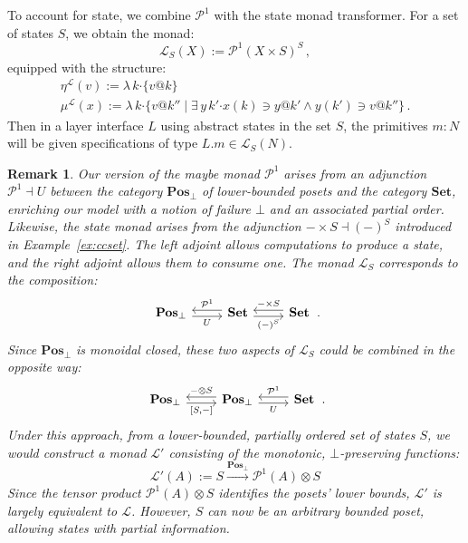 \documentclass[11pt,oneside]{book}
\newtheorem{remark}[theorem]{Remark}
\theoremstyle{definition}
\newcommand{\bdot}{\boldsymbol{\cdot}}
\begin{document}
To account for state,
we combine $\mathcal{P}^1$ with the state monad transformer.
For a set of states $S$,
we obtain the monad:
\[
  \mathcal{L}_S(X) :=
    \mathcal{P}^1(X \times S)^S \,,
\]
equipped with the structure:
\begin{gather*}
  \eta^\mathcal{L}(v) :=
    \lambda \, k \bdot \{ v@k \} \\
  \mu^\mathcal{L}(x) :=
    \lambda \, k \bdot \{ v@k'' \mid
      \exists \, y \, k' \bdot x(k) \ni y@k' \wedge y(k') \ni v@k'' \}
  \,.
\end{gather*}
Then in a layer interface $L$
using abstract states in the set $S$,
the primitives $m \mathbin: N$
will be given specifications
of type $L.m \in \mathcal{L}_S(N)$.

\begin{remark}
Our version of the \emph{maybe} monad $\mathcal{P}^1$
arises from an adjunction $\mathcal{P}^1 \dashv U$
between the category $\mathbf{Pos}_\bot$
of lower-bounded posets
and the category $\mathbf{Set}$,
enriching our model with a notion of failure $\bot$
and an associated partial order.
Likewise,
the state monad arises from the adjunction
$- \times S \dashv (-)^S$
introduced in Example~\ref{ex:ccset}.
The left adjoint allows computations to produce a state,
and the right adjoint allows them to consume one.
The monad $\mathcal{L}_S$ corresponds to the composition:
\[
  \begin{tikzcd}
    \mathbf{Pos}_\bot
      \ar[r, "U"', shift right] &
    \mathbf{Set}
      \ar[l, "\mathcal{P}^1"', shift right]
      \ar[r, "(-)^S"', shift right] &
    \mathbf{Set}
      \ar[l, "- \times S"', shift right]
   \end{tikzcd}
  \,.
\]
Since $\mathbf{Pos}_\bot$ is monoidal closed,
these two aspects of $\mathcal{L}_S$
could be combined in the opposite way:
\[
  \begin{tikzcd}
    \mathbf{Pos}_\bot
      \ar[r, "{[S, {-}]}"', shift right] &
    \mathbf{Pos}_\bot
      \ar[l, "{-} \otimes S"', shift right]
      \ar[r, "U"', shift right] &
    \mathbf{Set}
      \ar[l, "\mathcal{P}^1"', shift right]
   \end{tikzcd}
  \,.
\]
Under this approach,
from a \emph{lower-bounded, partially ordered}
set of states $S$, we would construct a monad $\mathcal{L}'$
consisting of the \emph{monotonic, $\bot$-preserving} functions:
\[
  \mathcal{L}'(A) := S \xrightarrow{\mathbf{Pos}_\bot} \mathcal{P}^1(A) \otimes S
\]
Since the tensor product $\mathcal{P}^1(A) \otimes S$ identifies
the posets' lower bounds,
$\mathcal{L}'$ is largely equivalent to $\mathcal{L}$.
However, $S$ can now be an arbitrary bounded poset,
allowing states with partial information.
\end{remark}
\end{document}
